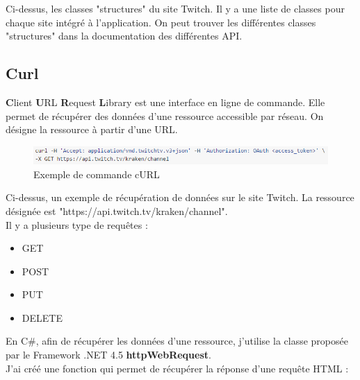 \documentclass[11pt]{report} %
\begin{document}
		Ci-dessus, les classes "structures" du site Twitch. Il y a une liste de classes pour chaque site intégré à l'application. On peut trouver les différentes classes "structures" dans la documentation des différentes API.
		
		\newpage
		\subsection{Curl}
		\textbf{C}lient \textbf{U}RL \textbf{R}equest \textbf{L}ibrary est une interface en ligne de commande. Elle permet de récupérer des données d'une ressource accessible par réseau. On désigne la ressource à partir d'une URL.
		
		\begin{figure}[h]
			\center
			\includegraphics[width=1\textwidth]{../img/curl.png}
			\caption{Exemple de commande cURL}
			\label{cURL command}
		\end{figure}
		
		Ci-dessus, un exemple de récupération de données sur le site Twitch. La ressource désignée est "https://api.twitch.tv/kraken/channel".\\
		
		Il y a plusieurs type de requêtes :
		\begin{itemize}
			\item GET
			\item POST
			\item PUT
			\item DELETE
		\end{itemize}
		
		En C\#, afin de récupérer les données d'une ressource, j'utilise la classe proposée par le Framework .NET 4.5 \textbf{httpWebRequest}.\\		
		J'ai créé une fonction qui permet de récupérer la réponse d'une requête HTML :
		
\end{document}
